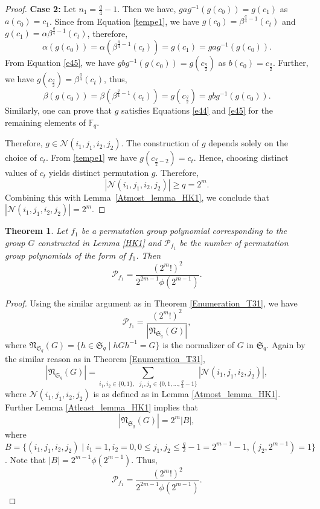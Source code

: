 \documentclass[11pt]{amsart}
\theoremstyle{plain}
\newtheorem{thm}{Theorem}[section]
\numberwithin{equation}{section}
\def\F{{\mathbb F}}
\begin{document}
\begin{proof}
\textbf{Case 2:} Let $n_1=\frac{q}{4}-1$. Then we have, $gag^{-1}(g(c_0))= g(c_1)$ as $a(c_0)=c_1$. Since from Equation \eqref{tempe1}, we have $g(c_0)=\beta^{\frac{q}{4}-1}(c_t)$ and $g(c_1)=\alpha \beta^{\frac{q}{4}-1}(c_t)$, therefore,
\[
\alpha(g(c_0))=\alpha (\beta^{\frac{q}{4}-1}(c_t))=g(c_1)=gag^{-1}(g(c_0)).
\]
 From Equation \eqref{e45}, we have $gbg^{-1}(g(c_0))= g(c_{\frac{q}{2}})$ as $b(c_0)=c_{\frac{q}{2}}$. Further, we have $g(c_{\frac{q}{2}})=\beta^{\frac{q}{4}}(c_t)$, thus,
 \[
 \beta(g(c_0))=\beta(\beta^{\frac{q}{4}-1}(c_t))=g(c_{\frac{q}{2}})=gbg^{-1}(g(c_0)).
 \]
 Similarly, one can prove that $g$ satisfies Equations \eqref{e44} and \eqref{e45} for the remaining elements of $\F_q$. 

Therefore, $g\in \mathcal{N}(i_1,j_1,i_2,j_2)$.  The construction of $g$ depends solely on the choice of $c_t$. 
From \eqref{tempe1} we have $g(c_{\frac{q}{2}-2}) = c_t$. 
Hence, choosing distinct values of $c_t$ yields distinct permutation $g$. 
Therefore,
\[
|\mathcal{N}(i_1,j_1,i_2,j_2)| \ge q = 2^{m}.
\]
Combining this with Lemma~\ref{Atmost_lemma_HK1}, we conclude that
$
|\mathcal{N}(i_1,j_1,i_2,j_2)| = 2^{m}.
$
\end{proof}
\begin{thm}\label{Enumeration_HK1}
Let $f_1$ be a permutation group polynomial corresponding to the group $G$ constructed in Lemma \ref{HK1} and $\mathcal{P}_{f_1}$ be the number of permutation group polynomials of the form of $f_1$. Then 
\[
\mathcal{P}_{f_1}=\frac{(2^m!)^2}{2^{2m-1}\phi(2^{m-1})}.
\]
\end{thm}
\begin{proof}
Using the similar argument as in Theorem \ref{Enumeration_T31}, we have 
\[
\mathcal{P}_{f_1}=\frac{(2^m!)^2}{|\mathfrak{N}_{\mathfrak{S}_q}(G)|}, 
\]
where $\mathfrak{N}_{\mathfrak{S}_q}(G)=\{h \in \mathfrak{S}_q \mid hGh^{-1}=G\}$ is the normalizer of $G$ in $\mathfrak{S}_q$. Again by the  similar reason as in Theorem \ref{Enumeration_T31},
\[
|\mathfrak{N}_{\mathfrak{S}_q}(G)|=\displaystyle \sum_{i_1,i_2 \in \{0,1\}, \text{ } j_1,j_2 \in \{0,1,\ldots,\frac{q}{2}-1\}}|\mathcal{N}(i_1,j_1,i_2,j_2)|,
\]
where $\mathcal{N}(i_1,j_1,i_2,j_2)$ is as defined as in Lemma \ref{Atmost_lemma_HK1}. Further
Lemma \ref{Atleast_lemma_HK1} implies that 
\[
|\mathfrak{N}_{\mathfrak{S}_q}(G)|=2^m|B|,
\]
where $B=\{(i_1,j_1,i_2,j_2)\mid i_1=1,i_2=0,0 \leq j_1,j_2 \leq \frac{q}{2}-1=2^{m-1}-1, (j_2,2^{m-1})=1\}$. Note that $|B|=2^{m-1}\phi(2^{m-1})$. Thus, 
\[
\mathcal{P}_{f_1}=\frac{(2^m!)^2}{2^{2m-1}\phi(2^{m-1})}.
\]
\end{proof}
\end{document}
